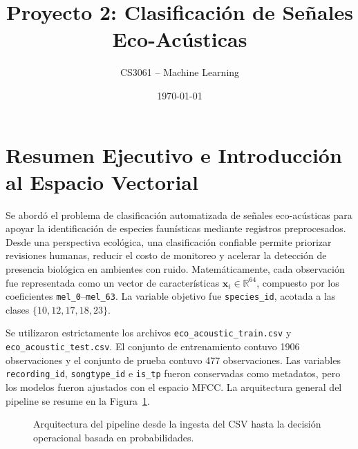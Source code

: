 \documentclass[11pt,a4paper]{article}
\title{Proyecto 2: Clasificaci\'on de Se\~nales Eco-Ac\'usticas}
\author{CS3061 -- Machine Learning}
\date{\today}
\begin{document}
\maketitle

\section{Resumen Ejecutivo e Introducci\'on al Espacio Vectorial}

Se abord\'o el problema de clasificaci\'on automatizada de se\~nales eco-ac\'usticas para apoyar la identificaci\'on de especies faun\'isticas mediante registros preprocesados. Desde una perspectiva ecol\'ogica, una clasificaci\'on confiable permite priorizar revisiones humanas, reducir el costo de monitoreo y acelerar la detecci\'on de presencia biol\'ogica en ambientes con ruido. Matem\'aticamente, cada observaci\'on fue representada como un vector de caracter\'isticas $\mathbf{x}_i \in \mathbb{R}^{64}$, compuesto por los coeficientes \texttt{mel\_0}--\texttt{mel\_63}. La variable objetivo fue \texttt{species\_id}, acotada a las clases $\{10,12,17,18,23\}$.

Se utilizaron estrictamente los archivos \texttt{eco\_acoustic\_train.csv} y \texttt{eco\_acoustic\_test.csv}. El conjunto de entrenamiento contuvo 1906 observaciones y el conjunto de prueba contuvo 477 observaciones. Las variables \texttt{recording\_id}, \texttt{songtype\_id} e \texttt{is\_tp} fueron conservadas como metadatos, pero los modelos fueron ajustados con el espacio MFCC. La arquitectura general del pipeline se resume en la Figura~\ref{fig:arquitectura}.

\begin{figure}[H]
\centering
{}
\caption{Arquitectura del pipeline desde la ingesta del CSV hasta la decisi\'on operacional basada en probabilidades.}
\label{fig:arquitectura}
\end{figure}
\end{document}
